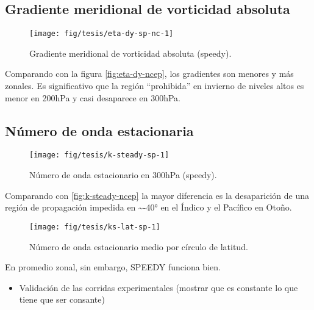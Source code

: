 \documentclass[spanish,a4paper]{book}
\providecommand{\tightlist}{%
  \setlength{\itemsep}{0pt}\setlength{\parskip}{0pt}}
\begin{document}
\subsection{Gradiente meridional de vorticidad
absoluta}\label{gradiente-meridional-de-vorticidad-absoluta-1}

\begin{figure}

{\centering \texttt{[image: fig/tesis/eta-dy-sp-nc-1]} 

}

\caption{Gradiente meridional de vorticidad absoluta (speedy).}\label{fig:eta-dy-sp-nc}
\end{figure}

Comparando con la figura \autoref{fig:eta-dy-ncep}, los gradientes son
menores y más zonales. Es significativo que la región ``prohibida'' en
invierno de niveles altos es menor en 200hPa y casi desaparece en
300hPa.

\subsection{Número de onda
estacionaria}\label{numero-de-onda-estacionaria-1}

\begin{figure}
\texttt{[image: fig/tesis/k-steady-sp-1]} \caption{Número de onda estacionario en 300hPa (speedy).}\label{fig:k-steady-sp}
\end{figure}

Comparando con \autoref{fig:k-steady-ncep} la mayor diferencia es la
desaparición de una región de propagación impedida en
\textasciitilde{}-40° en el Índico y el Pacífico en Otoño.

\begin{figure}

{\centering \texttt{[image: fig/tesis/ks-lat-sp-1]} 

}

\caption{Número de onda estacionario medio por círculo de latitud.}\label{fig:ks-lat-sp}
\end{figure}

En promedio zonal, sin embargo, SPEEDY funciona bien.

\begin{itemize}
\tightlist
\item
  Validación de las corridas experimentales (mostrar que es constante lo
  que tiene que ser consante)
\end{itemize}
\end{document}
